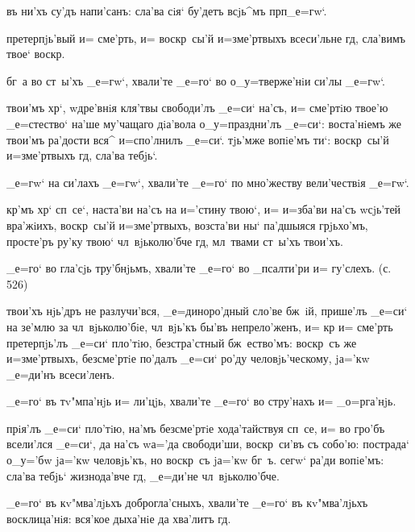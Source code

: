   въ ни'хъ су'дъ напи'санъ: 
сла'ва сiя` бу'детъ всjь^мъ прп _е=гw`.

 претерпjь'вый и= сме'рть, и= воскр~сы'й 
и=з\ъ ме'ртвыхъ всеси'льне гд, сла'вимъ твое` 
воскр.

  бг~а во ст~ы'хъ _е=гw`, хвали'те 
_е=го` во о_у=тверже'нiи си'лы _е=гw`.

 твои'мъ хр`, w\т дре'внiя кля'твы 
свободи'лъ _е=си` на'съ, и= сме'ртiю твое'ю _е=стество` 
на'ше му'чащаго дiа'вола о_у=праздни'лъ _е=си`: 
воста'нiемъ же твои'мъ ра'дости вся^ и=спо'лнилъ _е=си`. 
тjь'мже вопiе'мъ ти`: воскр~сы'й и=з\ъ ме'ртвыхъ гд, 
сла'ва тебjь`.

  _е=гw` на си'лахъ _е=гw`, 
хвали'те _е=го` по мно'жеству вели'чествiя _е=гw`.

 кр'мъ хр` сп~се`, наста'ви на'съ 
на и='стину твою`, и= и=зба'ви на'съ w\т сjь'тей 
вра'жiихъ, воскр~сы'й и=з\ъ ме'ртвыхъ, возста'ви ны` 
па'дшыяся грjьхо'мъ, просте'ръ ру'ку твою` чл~вjьколю'бче 
гд, мл~твами ст~ы'хъ твои'хъ.

  _е=го` во гла'сjь тру'бнjьмъ, 
хвали'те _е=го` во _псалти'ри и= гу'слехъ. (с. 526)

 твои'хъ нjь'дръ не разлучи'вся, 
_е=диноро'дный сло'ве бж~iй, прише'лъ _е=си` на зе'млю за 
чл~вjьколю'бiе, чл~вjь'къ бы'въ непрело'женъ, и= кр 
и= сме'рть претерпjь'лъ _е=си` пло'тiю, безстра'стный 
бж~ество'мъ: воскр~съ же и=з\ъ ме'ртвыхъ, безсме'ртiе 
по'далъ _е=си` ро'ду человjь'ческому, jа='кw _е=ди'нъ 
всеси'ленъ.


  _е=го` въ тv"мпа'нjь и= ли'цjь, 
хвали'те _е=го` во стру'нахъ и= _о=рга'нjь.

 прiя'лъ _е=си` пло'тiю, на'мъ безсме'ртiе 
хода'тайствуя сп~се, и= во гро'бъ всели'лся _е=си`, да 
на'съ w\т а='да свободи'ши, воскр~си'въ съ собо'ю: 
пострада` о_у='бw jа='кw человjь'къ, но воскр~съ jа='кw 
бг~ъ. сегw` ра'ди вопiе'мъ: сла'ва тебjь` жизнода'вче 
гд, _е=ди'не чл~вjьколю'бче.

  _е=го` въ кv"мва'лjьхъ 
доброгла'сныхъ, хвали'те _е=го` въ кv"мва'лjьхъ 
восклица'нiя: вся'кое дыха'нiе да хва'литъ гд.

